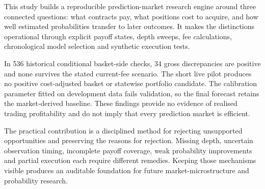 \label{sec:conclusion}
This study builds a reproducible prediction-market research engine around three connected questions: what contracts pay, what positions cost to acquire, and how well estimated probabilities transfer to later outcomes. It makes the distinctions operational through explicit payoff states, depth sweeps, fee calculations, chronological model selection and synthetic execution tests.

In 536 historical conditional basket-side checks, 34 gross discrepancies are positive and none survives the stated current-fee scenario. The short live pilot produces no positive cost-adjusted basket or statewise portfolio candidate. The calibration parameter fitted on development data fails validation, so the final forecast retains the market-derived baseline. These findings provide no evidence of realised trading profitability and do not imply that every prediction market is efficient.

The practical contribution is a disciplined method for rejecting unsupported opportunities and preserving the reasons for rejection. Missing depth, uncertain observation timing, incomplete payoff coverage, weak probability improvements and partial execution each require different remedies. Keeping those mechanisms visible produces an auditable foundation for future market-microstructure and probability research.
